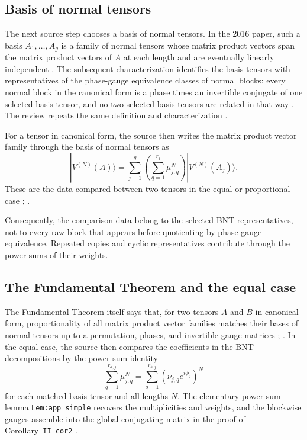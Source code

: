 \documentclass{article}
\begin{document}
\subsection{Basis of normal tensors}

The next source step chooses a basis of normal tensors. In the 2016 paper, such
a basis $A_1,\ldots,A_g$ is a family of normal tensors whose matrix product
vectors span the matrix product vectors of $A$ at each length and are
eventually linearly independent
\cite[lines~271--274]{Cirac2016MPDO_arXiv}. The subsequent characterization
identifies the basis tensors with representatives of the phase-gauge
equivalence classes of normal blocks: every normal block in the canonical form
is a phase times an invertible conjugate of one selected basis tensor, and no
two selected basis tensors are related in that way
\cite[lines~278--280]{Cirac2016MPDO_arXiv}. The review repeats the same
definition and characterization
\cite[lines~1846--1859]{Cirac2021Matrix}.

For a tensor in canonical form, the source then writes the matrix product vector
family through the basis of normal tensors as
\[
  |V^{(N)}(A)\rangle
    = \sum_{j=1}^g
        \left(\sum_{q=1}^{r_j}\mu_{j,q}^N\right)
        |V^{(N)}(A_j)\rangle.
\]
These are the data compared between two tensors in the equal or proportional
case
\cite[lines~283--302]{Cirac2016MPDO_arXiv};
\cite[lines~1864--1885]{Cirac2021Matrix}.

Consequently, the comparison data belong to the selected BNT representatives,
not to every raw block that appears before quotienting by phase-gauge
equivalence. Repeated copies and cyclic representatives contribute through the
power sums of their weights.

\subsection{The Fundamental Theorem and the equal case}

The Fundamental Theorem itself says that, for two tensors $A$ and $B$ in
canonical form, proportionality of all matrix product vector families matches
their bases of normal tensors up to a permutation, phases, and invertible gauge
matrices
\cite[lines~347--352]{Cirac2016MPDO_arXiv};
\cite[lines~1890--1900]{Cirac2021Matrix}. In the equal case, the source then
compares the coefficients in the BNT decompositions by the power-sum identity
\[
  \sum_{q=1}^{r_{a,j}}\mu_{j,q}^N
  =
  \sum_{q=1}^{r_{b,j}}(\nu_{j,q}e^{i\phi_j})^N
\]
for each matched basis tensor and all lengths $N$. The elementary power-sum
lemma \texttt{Lem:app\_simple}
\cite[lines~1155--1163]{Cirac2016MPDO_arXiv} recovers the multiplicities and
weights, and the blockwise gauges assemble into the global conjugating matrix in
the proof of Corollary~\texttt{II\_cor2}
\cite[lines~1184--1192]{Cirac2016MPDO_arXiv}.
\end{document}
